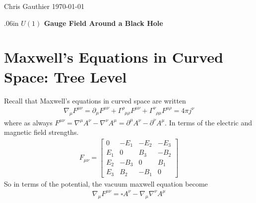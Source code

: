 \documentclass[12pt]{article}
\begin{document}
\begin{flushright}
Chris Gauthier
\today
\end{flushright}
\begin{center} 
\vglue .06in
{\Large \bf {$U(1)$ Gauge Field Around a Black Hole}}\\[.5in]

\end{center}
\section{Maxwell's Equations in Curved Space: Tree Level}
Recall that Maxwell's equations in curved space are written
\begin{gather}
\nabla_{\mu}
F^{\mu\nu}
=
\partial_{\mu}
F^{\mu\nu}
+
\Gamma^{\rho}_{\,\,\, \mu \rho}
F^{\mu \nu}
+
\Gamma^{\nu}_{\,\,\, \rho \mu}
F^{\mu \rho}
=
4 \pi j^{\nu}
\end{gather}
where as always $F^{\mu\nu} = \nabla^{\mu} A^{\nu} - \nabla^{\nu} A^{\mu} =  \partial^{\mu} A^{\nu} - \partial^{\nu} A^{\mu}$. In terms of the electric and magnetic field strengths. 
\begin{gather}
F_{\mu\nu}
=
\left[
\begin{array}{cccc}
0 & - E_{1} & - E_{2} & - E_{3}
\\
E_{1} & 0 & B_{3} & - B_{2}
\\
E_{2} & - B_{3} & 0 & B_{1}
\\
E_{3} & B_{2} & - B_{1} & 0
\end{array}
\right]
\end{gather}
So in terms of the potential, the vacuum maxwell equation become
\begin{gather}
\nabla_{\mu}
F^{\mu\nu}
=
\square A^{\nu}
-
\nabla_{\mu}
\nabla^{\nu}
A^{\mu}
\end{gather}
\end{document}
